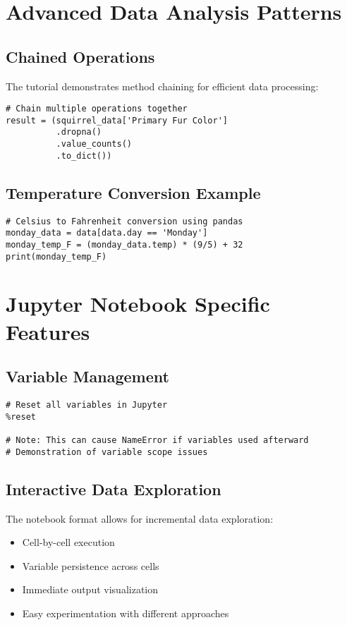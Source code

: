 \documentclass[12pt]{article}
\begin{document}
\section{Advanced Data Analysis Patterns}

\subsection{Chained Operations}

The tutorial demonstrates method chaining for efficient data processing:

\begin{lstlisting}
# Chain multiple operations together
result = (squirrel_data['Primary Fur Color']
          .dropna()
          .value_counts()
          .to_dict())
\end{lstlisting}

\subsection{Temperature Conversion Example}

\begin{lstlisting}
# Celsius to Fahrenheit conversion using pandas
monday_data = data[data.day == 'Monday']
monday_temp_F = (monday_data.temp) * (9/5) + 32
print(monday_temp_F)
\end{lstlisting}

\section{Jupyter Notebook Specific Features}

\subsection{Variable Management}

\begin{lstlisting}
# Reset all variables in Jupyter
%reset

# Note: This can cause NameError if variables used afterward
# Demonstration of variable scope issues
\end{lstlisting}

\subsection{Interactive Data Exploration}

The notebook format allows for incremental data exploration:
\begin{itemize}
    \item Cell-by-cell execution
    \item Variable persistence across cells
    \item Immediate output visualization
    \item Easy experimentation with different approaches
\end{itemize}
\end{document}
